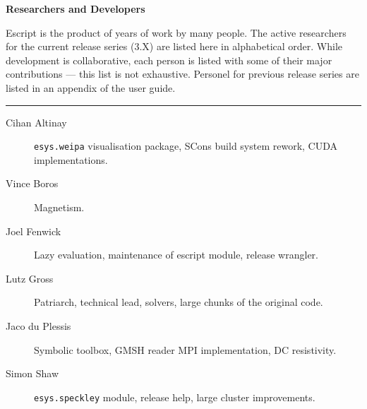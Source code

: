 
%
%
%

\vbox{}
\vfill
\begin{center}
\textbf{\Large Researchers and Developers}
\vspace{0.5cm}

Escript is the product of years of work by many people.
The active researchers for the current release series (3.X) are listed here in alphabetical order.
While development is collaborative, each person is listed with some of their major contributions --- this list is not exhaustive.
Personel for previous release series are listed in an appendix of the user guide.

\vspace{1cm}
\hrule
\vspace{1cm}
\begin{description}
\item[Cihan Altinay] \texttt{esys.weipa} visualisation package, SCons build system rework, CUDA implementations.
\item[Vince Boros] Magnetism.
\item[Joel Fenwick] Lazy evaluation, maintenance of escript module, release wrangler.
\item[Lutz Gross] Patriarch, technical lead, solvers, large chunks of the original code.
\item[Jaco du Plessis] Symbolic toolbox, GMSH reader MPI implementation, DC resistivity.
\item[Simon Shaw] \texttt{esys.speckley} module, release help, large cluster improvements.
\end{description}
\end{center}
\vfill
\pagebreak

